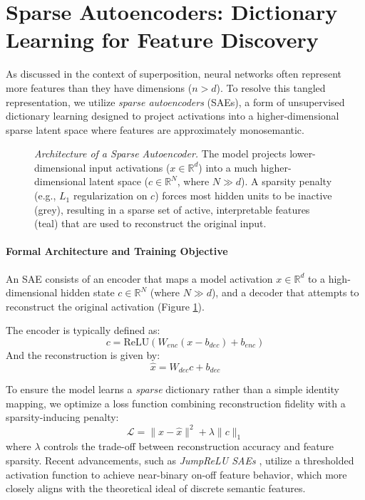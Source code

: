 \section{Sparse Autoencoders: Dictionary Learning for Feature Discovery}

As discussed in the context of superposition, neural networks often represent more features than they have dimensions ($n > d$). To resolve this tangled representation, we utilize \emph{sparse autoencoders} (SAEs), a form of unsupervised dictionary learning designed to project activations into a higher-dimensional sparse latent space where features are approximately monosemantic.

\begin{figure}[htbp]
    \centering
    \resizebox{0.85\textwidth}{!}{
        
    }
    \caption{\emph{Architecture of a Sparse Autoencoder.} The model projects lower-dimensional input activations ($x \in \mathbb{R}^d$) into a much higher-dimensional latent space ($c \in \mathbb{R}^N$, where $N \gg d$). A sparsity penalty (e.g., $L_1$ regularization on $c$) forces most hidden units to be inactive (grey), resulting in a sparse set of active, interpretable features (teal) that are used to reconstruct the original input. \label{fig:sae_architecture}}
    
\end{figure}

\paragraph{Formal Architecture and Training Objective}
An SAE consists of an encoder that maps a model activation $x \in \mathbb{R}^d$ to a high-dimensional hidden state $c \in \mathbb{R}^N$ (where $N \gg d$), and a decoder that attempts to reconstruct the original activation (Figure \ref{fig:sae_architecture}).

The encoder is typically defined as:
\begin{equation}
    c = \text{ReLU}(W_{enc}(x - b_{dec}) + b_{enc})
\end{equation}
And the reconstruction is given by:
\begin{equation}
    \hat{x} = W_{dec} c + b_{dec}
\end{equation}

To ensure the model learns a \emph{sparse} dictionary rather than a simple identity mapping, we optimize a loss function combining reconstruction fidelity with a sparsity-inducing penalty:
\begin{equation}
    \mathcal{L} = \|x - \hat{x}\|^2 + \lambda \|c\|_1
\end{equation}
where $\lambda$ controls the trade-off between reconstruction accuracy and feature sparsity. Recent advancements, such as \emph{JumpReLU SAEs} \citep{rajamanoharan2024jumping}, utilize a thresholded activation function to achieve near-binary on-off feature behavior, which more closely aligns with the theoretical ideal of discrete semantic features.


